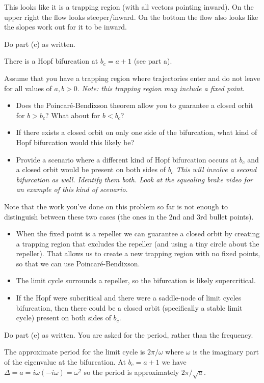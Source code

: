 \documentclass[12pt,letterpaper,answers]{exam}
\begin{document}
\begin{questions}
\begin{parts}
\begin{solution}
This looks like it is a trapping region (with all vectors pointing inward).  On the upper right the flow looks steeper/inward.  On the bottom the flow also looks like the slopes work out for it to be inward.

\end{solution}
\item Do part (c) as written.
\begin{solution}
There is a Hopf bifurcation at $b_c = a+1$ (see part a).
\end{solution}
\item Assume that you have a trapping region where trajectories enter and do not leave for all values of $a,b>0$.  \emph{Note: this trapping region may include a fixed point.}
\begin{itemize}
\item Does the Poincar\'e-Bendixson theorem allow you to guarantee a closed orbit for $b>b_c$?  What about for $b<b_c$?
\item If there exists a closed orbit on only one side of the bifurcation, what kind of Hopf bifurcation would this likely be?
\item Provide a scenario where a different kind of Hopf bifurcation occurs at $b_c$ and a closed orbit would be present on both sides of $b_c$ \emph{This will involve a second bifurcation as well.  Identify them both.  Look at the squealing brake video for an example of this kind of scenario.} 
\end{itemize}
Note that the work you've done on this problem so far is not enough to distinguish between these two cases (the ones in the 2nd and 3rd bullet points).
\begin{solution}
\begin{itemize}
    \item When the fixed point is a repeller we can guarantee a closed orbit by creating a trapping region that excludes the repeller (and using a tiny circle about the repeller).  That allows us to create a new trapping region with no fixed points, so that we can use Poincaré-Bendixson.
    \item The limit cycle surrounds a repeller, so the bifurcation is likely supercritical.
    \item If the Hopf were subcritical and there were a saddle-node of limit cycles bifurcation, then there could be a closed orbit (specifically a stable limit cycle) present on both sides of $b_c$.
\end{itemize}
\end{solution}
\item Do part (e) as written.  You are asked for the period, rather than the frequency.
\begin{solution}
    The approximate period for the limit cycle is $2\pi/\omega$ where $\omega$ is the imaginary part of the eigenvalue at the bifurcation.  At $b_c = a + 1$ we have $\Delta = a = i\omega(-i\omega)=\omega^2$ so the period is approximately $2\pi/\sqrt{a}$.


\end{solution}
\end{parts}
\end{questions}
\end{document}
